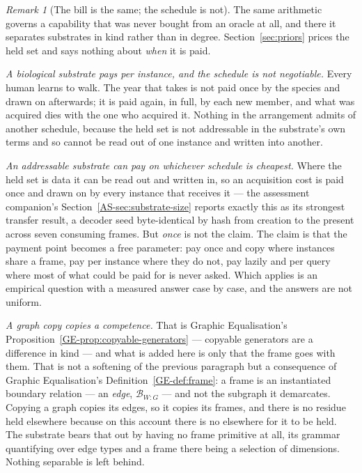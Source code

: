 \documentclass[11pt,a4paper]{article}
\theoremstyle{remark}
\newtheorem{remark}[definition]{Remark}
\begin{document}
\begin{remark}[The bill is the same; the schedule is not]\label{rem:schedule}
The same arithmetic governs a capability that was never bought from an oracle at all, and there it
separates substrates in kind rather than in degree. Section~\ref{sec:priors} prices the held set and
says nothing about \emph{when} it is paid.

\emph{A biological substrate pays per instance, and the schedule is not negotiable.} Every human learns
to walk. The year that takes is not paid once by the species and drawn on afterwards; it is paid again,
in full, by each new member, and what was acquired dies with the one who acquired it. Nothing in the
arrangement admits of another schedule, because the held set is not addressable in the substrate's own
terms and so cannot be read out of one instance and written into another.

\emph{An addressable substrate can pay on whichever schedule is cheapest.} Where the held set is data
it can be read out and written in, so an acquisition cost is paid once and drawn on by every instance
that receives it --- the assessment companion's Section~\ref{AS-sec:substrate-size} reports exactly this as its
strongest transfer result,
a decoder seed byte-identical by hash from creation to the present across seven consuming frames. But
\emph{once} is not the claim. The claim is that the payment point becomes a free parameter: pay once
and copy where instances share a frame, pay per instance where they do not, pay lazily and per query
where most of what could be paid for is never asked. Which applies is an empirical question with a
measured answer case by case, and the answers are not uniform.

\emph{A graph copy copies a competence.} That is Graphic
Equalisation's Proposition~\ref{GE-prop:copyable-generators} --- copyable generators are a difference
in kind --- and what is added here is only that the frame goes with them. That is not a softening of
the previous paragraph but a
consequence of Graphic Equalisation's Definition~\ref{GE-def:frame}: a frame is an instantiated boundary relation ---
an \emph{edge}, $\mathcal{B}_{W:G}$ --- and not the subgraph it demarcates. Copying a graph copies its
edges, so it copies its frames, and there is no residue held elsewhere because on this account there is
no elsewhere for it to be held. The substrate bears that out by having no frame primitive at all, its
grammar quantifying over edge types and a frame there being a selection of dimensions. Nothing
separable is left behind.


\end{remark}
\end{document}
